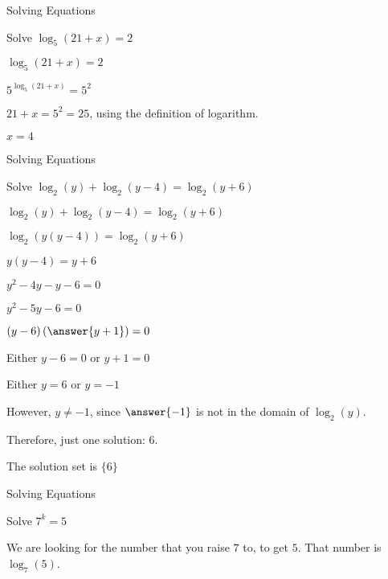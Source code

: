 \documentclass{ximera}
\begin{document}
\begin{example} Solving Equations


Solve $\log_5(21 + x) = 2$


\begin{explanation}


$\log_5(21 + x) = 2$

$5^{\log_5(21 + x)} = 5^2$

$21 + x = 5^2 = 25$, using the definition of logarithm.

$x = 4$
\end{explanation}
\end{example}










\begin{example} Solving Equations


Solve $\log_2(y) + \log_2(y-4) = \log_2(y+6)$

\begin{explanation}


$\log_2(y) + \log_2(y-4) = \log_2(y+6)$

$\log_2(y(y-4)) = \log_2(y+6)$

$y(y-4) = y+6$    

$y^2 - 4y - y - 6 = 0$

$y^2 - 5y - 6 = 0$

$(y-6) \left( \answer{y+1} \right) = 0$


Either $y-6 = 0$ or $y+1 = 0$

Either $y = 6$ or $y = -1$

However, $y \ne -1$, since $\answer{-1}$ is not in the domain of $\log_2(y)$.

Therefore, just one solution: $6$.

The solution set is $\{ 6 \}$
\end{explanation}
\end{example}






\begin{example} Solving Equations


Solve $7^k = 5$


\begin{explanation}


We are looking for the number that you raise $7$ to, to get $5$.  That number  is $\log_7(5)$.
\end{explanation}
\end{example}
\end{document}
